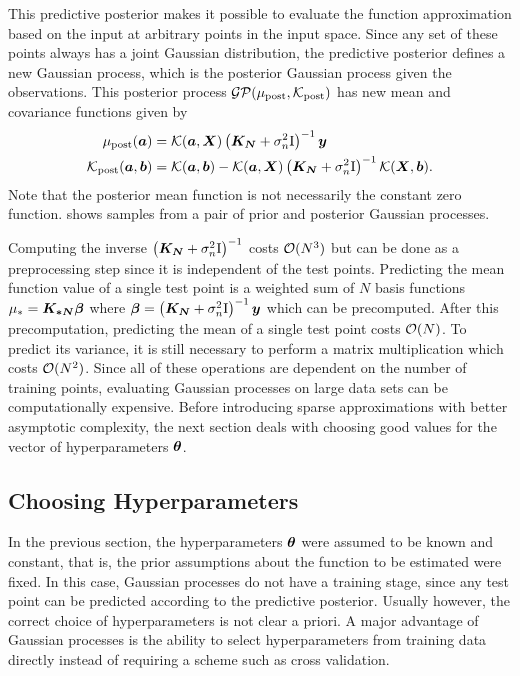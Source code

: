 This predictive posterior makes it possible to evaluate the function approximation based on the input at arbitrary points in the input space.
Since any set of these points always has a joint Gaussian distribution, the predictive posterior defines a new Gaussian process, which is the posterior Gaussian process given the observations.
This posterior process $\operatorname{\mathcal{GP}}(\mu_\text{post}, \operatorname{\mathcal{K}}_\text{post})$ has new mean and covariance functions given by
\begin{align}
    \begin{split}
        \mu_\text{post}(\bm{a}) &= \operatorname{\mathcal{K}}(\bm{a}, \bm{X}) \left(\bm{K_N} + \sigma_n^2 \mathrm{I} \right)^{-1} \bm{y} \\
        \operatorname{\mathcal{K}}_\text{post}(\bm{a}, \bm{b}) &= \operatorname{\mathcal{K}}(\bm{a}, \bm{b}) - \operatorname{\mathcal{K}}(\bm{a}, \bm{X}) \left( \bm{K_N} + \sigma_n^2 \mathrm{I} \right)^{-1} \operatorname{\mathcal{K}}(\bm{X}, \bm{b}).
    \end{split}
\end{align}
Note that the posterior mean function is not necessarily the constant zero function.
 shows samples from a pair of prior and posterior Gaussian processes.

Computing the inverse $\left(\bm{K_N} + \sigma_n^2 \mathrm{I} \right)^{-1}$ costs $\operatorname{\mathcal{O}}(N^3)$ but can be done as a preprocessing step since it is independent of the test points.
Predicting the mean function value of a single test point is a weighted sum of $N$ basis functions $\mu_\ast = \bm{K_{\ast N}} \bm{\beta}$ where $\bm{\beta} = \left(\bm{K_N} + \sigma_n^2 \mathrm{I} \right)^{-1} \bm{y}$ which can be precomputed.
After this precomputation, predicting the mean of a single test point costs $\operatorname{\mathcal{O}}(N)$.
To predict its variance, it is still necessary to perform a matrix multiplication which costs $\operatorname{\mathcal{O}}(N^2)$.
Since all of these operations are dependent on the number of training points, evaluating Gaussian processes on large data sets can be computationally expensive.
Before introducing sparse approximations with better asymptotic complexity, the next section deals with choosing good values for the vector of hyperparameters $\bm{\theta}$.

\subsection{Choosing Hyperparameters}
\label{sub:gp_hyperparameters}
In the previous section, the hyperparameters $\bm{\theta}$ were assumed to be known and constant, that is, the prior assumptions about the function to be estimated were fixed.
In this case, Gaussian processes do not have a training stage, since any test point can be predicted according to the predictive posterior.
Usually however, the correct choice of hyperparameters is not clear a priori.
A major advantage of Gaussian processes is the ability to select hyperparameters from training data directly instead of requiring a scheme such as cross validation.

